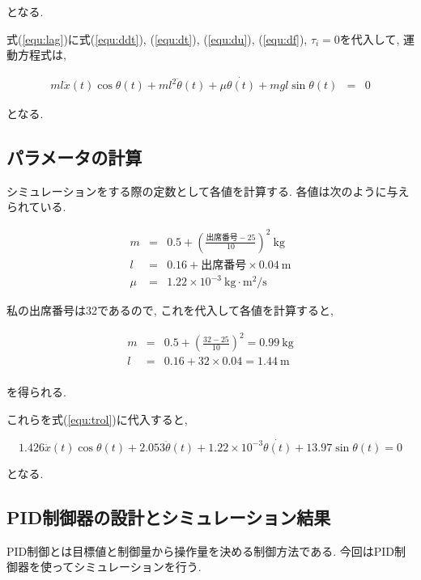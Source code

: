 \documentclass[titlepage]{jsarticle}
\begin{document}
        となる.

        式(\ref{equ:lag})に式(\ref{equ:ddt}), (\ref{equ:dt}),
         (\ref{equ:du}), (\ref{equ:df}), $\tau _i = 0$を代入して,
        運動方程式は,

        \begin{eqnarray}
            ml\ddot{x}(t)\cos{\theta(t)} + ml^2\ddot{\theta}(t) + \mu \dot{\theta(t)} + mgl \sin{\theta(t)} &=& 0 \label{equ:trol}
        \end{eqnarray}
        
        となる.

    \subsection{パラメータの計算}
        シミュレーションをする際の定数として各値を計算する.
        各値は次のように与えられている.

        \begin{eqnarray*}
            m &=& 0.5 + \left(\frac{出席番号 - 25}{10}\right)^2 \ \mathrm{kg} \\
            l &=& 0.16 + 出席番号 \times 0.04 \ \mathrm{m} \\
            \mu &=& 1.22 \times 10^{-3} \ \mathrm{kg \cdot m^2 / s}
        \end{eqnarray*}

        私の出席番号は32であるので,
        これを代入して各値を計算すると,

        \begin{eqnarray*}
            m &=& 0.5 + \left(\frac{32 - 25}{10}\right)^2 = 0.99 \ \mathrm{kg} \\
            l &=& 0.16 + 32 \times 0.04 = 1.44 \ \mathrm{m} \\
        \end{eqnarray*}

        を得られる.

        これらを式(\ref{equ:trol})に代入すると,

        \[
            1.426\ddot{x}(t)\cos{\theta(t)} + 2.053\ddot{\theta}(t) + 1.22 \times 10^{-3} \dot{\theta(t)} + 13.97 \sin{\theta(t)} = 0
        \]

        となる.

    \subsection{PID制御器の設計とシミュレーション結果}
        PID制御とは目標値と制御量から操作量を決める制御方法である.
        今回はPID制御器を使ってシミュレーションを行う.
\end{document}

